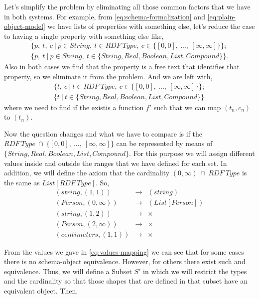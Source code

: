 Let's simplify the problem by eliminating all those common factors that we have in both systems. For example, from \cref{eq:schema-formalization} and \cref{eq:plain-object-model}
we have lists of properties with something else, let's reduce the case to having a single property with something else like,
\begin{equation}
\begin{gathered}
\{p,\ t,\ c\ |\ p \in String,\ t \in RDF\ Type,\ c \in \{[0,0],\ ...,\ [\infty,\infty] \}\};\\
\{p,\ t\ |\ p \in String,\ t \in \{String, Real, Boolean, List, Compound\}\}.    
\end{gathered}
\end{equation}
Also in both cases we find that the property is a free text that identifies that property, so we eliminate it from the problem. And we are left with,
\begin{equation}
\begin{gathered}
\{t,\ c\ |\ t \in RDF\ Type,\ c \in \{[0,0],\ ...,\ [\infty,\infty] \}\};\\
\{t\ |\ t \in \{String, Real, Boolean, List, Compound\}\} 
\end{gathered}
\end{equation}
where we need to find if the existis a function $f'$ such that we can map $(t_n,c_n)$ to $(t_n)$.

Now the question changes and what we have to compare is if the $RDF\ Type\ \cap\ \{[0,0],\ ...,\ [\infty,\infty]\}$ can be represented by means of
$\{String, Real, Boolean, List, Compound\}$. For this purpose we will assign different values inside and outside the ranges that we have defined for each set.
In addition, we will define the axiom that the cardinality $(0, \infty)\ \cap\ RDF\ Type$ is the same as $List[RDF\ Type]$. So,
\begin{equation}\label{eq:values-mapping}
    \begin{aligned}
(string,(1,1)) & \rightarrow & (string)\\
(Person,(0,\infty)) & \rightarrow & (List[Person])\\
(string,(1,2)) & \rightarrow & \times \\
(Person,(2,\infty)) & \rightarrow & \times \\
(centimeters,(1,1)) & \rightarrow & \times  
    \end{aligned}
\end{equation}

From the values we gave in \cref{eq:values-mapping} we can see that for some cases there is no schema-object equivalence. However, for others there exist
such and equivalence. Thus, we will define a Subset $S'$ in which we will restrict the types and the cardinality so that those shapes that are defined in
that subset have an equivalent object. Then,

